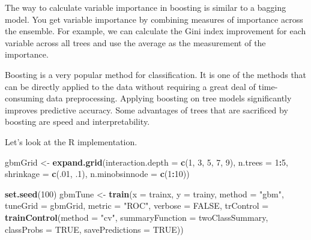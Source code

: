 \documentclass[12pt,]{krantz}
\makeatletter
\newenvironment{Shaded}{\begin{snugshade}}{\end{snugshade}}
\newcommand{\DataTypeTok}[1]{\textcolor[rgb]{0.27,0.27,0.27}{#1}}
\newcommand{\DecValTok}[1]{\textcolor[rgb]{0.06,0.06,0.06}{#1}}
\newcommand{\FloatTok}[1]{\textcolor[rgb]{0.06,0.06,0.06}{#1}}
\newcommand{\KeywordTok}[1]{\textcolor[rgb]{0.27,0.27,0.27}{\textbf{#1}}}
\newcommand{\NormalTok}[1]{#1}
\newcommand{\OperatorTok}[1]{\textcolor[rgb]{0.43,0.43,0.43}{\textbf{#1}}}
\newcommand{\OtherTok}[1]{\textcolor[rgb]{0.37,0.37,0.37}{#1}}
\newcommand{\StringTok}[1]{\textcolor[rgb]{0.5,0.5,0.5}{#1}}
\newenvironment{kframe}{%
\medskip{}
\setlength{\fboxsep}{.8em}
 \def\at@end@of@kframe{}%
 \ifinner\ifhmode%
  \def\at@end@of@kframe{\end{minipage}}%
  \begin{minipage}{\columnwidth}%
 \fi\fi%
 \def\FrameCommand##1{\hskip\@totalleftmargin \hskip-\fboxsep
 \colorbox{shadecolor}{##1}\hskip-\fboxsep
     \hskip-\linewidth \hskip-\@totalleftmargin \hskip\columnwidth}%
 \MakeFramed {\advance\hsize-\width
   \@totalleftmargin\z@ \linewidth\hsize
   \@setminipage}}%
 {\par\unskip\endMakeFramed%
 \at@end@of@kframe}
\renewenvironment{Shaded}{\begin{kframe}}{\end{kframe}}
\makeatother
\begin{document}
The way to calculate variable importance in boosting is similar to a bagging model. You get variable importance by combining measures of importance across the ensemble. For example, we can calculate the Gini index improvement for each variable across all trees and use the average as the measurement of the importance.

Boosting is a very popular method for classification. It is one of the methods that can be directly applied to the data without requiring a great deal of time-consuming data preprocessing. Applying boosting on tree models significantly improves predictive accuracy. Some advantages of trees that are sacrificed by boosting are speed and interpretability.

Let's look at the R implementation.

\begin{Shaded}
\begin{Highlighting}[]
\NormalTok{gbmGrid <-}\StringTok{ }\KeywordTok{expand.grid}\NormalTok{(}\DataTypeTok{interaction.depth =} \KeywordTok{c}\NormalTok{(}\DecValTok{1}\NormalTok{, }\DecValTok{3}\NormalTok{, }\DecValTok{5}\NormalTok{, }\DecValTok{7}\NormalTok{, }\DecValTok{9}\NormalTok{),}
                       \DataTypeTok{n.trees =} \DecValTok{1}\OperatorTok{:}\DecValTok{5}\NormalTok{,}
                       \DataTypeTok{shrinkage =} \KeywordTok{c}\NormalTok{(.}\DecValTok{01}\NormalTok{, }\FloatTok{.1}\NormalTok{),}
                       \DataTypeTok{n.minobsinnode =} \KeywordTok{c}\NormalTok{(}\DecValTok{1}\OperatorTok{:}\DecValTok{10}\NormalTok{))}

\KeywordTok{set.seed}\NormalTok{(}\DecValTok{100}\NormalTok{)}
\NormalTok{gbmTune <-}\StringTok{ }\KeywordTok{train}\NormalTok{(}\DataTypeTok{x =}\NormalTok{ trainx, }
                \DataTypeTok{y =}\NormalTok{ trainy,}
                \DataTypeTok{method =} \StringTok{"gbm"}\NormalTok{,}
                \DataTypeTok{tuneGrid =}\NormalTok{ gbmGrid,}
                \DataTypeTok{metric =} \StringTok{"ROC"}\NormalTok{,}
                \DataTypeTok{verbose =} \OtherTok{FALSE}\NormalTok{,}
                \DataTypeTok{trControl =} \KeywordTok{trainControl}\NormalTok{(}\DataTypeTok{method =} \StringTok{"cv"}\NormalTok{,}
                           \DataTypeTok{summaryFunction =}\NormalTok{ twoClassSummary,}
                           \DataTypeTok{classProbs =} \OtherTok{TRUE}\NormalTok{,}
                           \DataTypeTok{savePredictions =} \OtherTok{TRUE}\NormalTok{))}
\end{Highlighting}
\end{Shaded}
\end{document}
